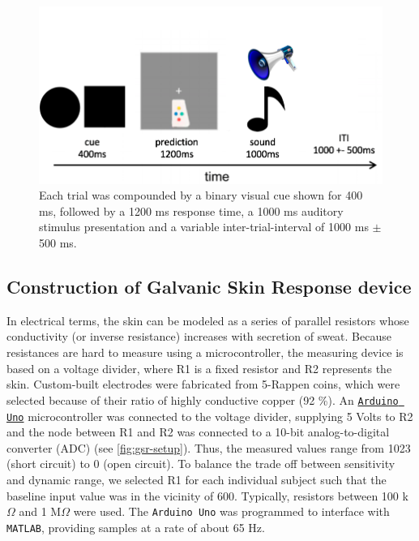 \documentclass{article}
\begin{document}
\begin{multicols}{2}
\begin{figure}[H]
\centering
\includegraphics[width=.48\textwidth]{exp.png}
  \caption{ Each trial was compounded by a binary visual cue shown for 400 ms, followed by a 1200 ms response time, a 1000 ms auditory stimulus presentation and a variable inter-trial-interval of 1000 ms $\pm$ 500 ms.}
  \label{fig:exp}
\end{figure}%

\subsection*{Construction of Galvanic Skin Response device}

In electrical terms, the skin can be modeled as a series of parallel resistors whose conductivity (or inverse resistance) increases with secretion of sweat. Because resistances are hard to measure using a microcontroller, the measuring device is based on a voltage divider, where R1 is a fixed resistor and R2 represents the skin. Custom-built electrodes were fabricated from 5-Rappen coins, which were selected because of their ratio of highly conductive copper (92 \%). An \texttt{\href{https://www.arduino.cc}{Arduino Uno}} microcontroller was connected to the voltage divider, supplying 5 Volts to R2 and the node between R1 and R2 was connected to a 10-bit analog-to-digital converter (ADC) (see \autoref{fig:gsr-setup}). Thus, the measured values range from 1023 (short circuit) to 0 (open circuit). To balance the trade off between sensitivity and dynamic range, we selected R1 for each individual subject such that the baseline input value was in the vicinity of 600. Typically, resistors between 100 k$\Omega$ and 1 M$\Omega$ were used. 
The \texttt{Arduino Uno} was programmed to interface with \texttt{MATLAB}, providing samples at a rate of about 65 Hz. 


\vspace{2mm}

\end{multicols}
\end{document}
